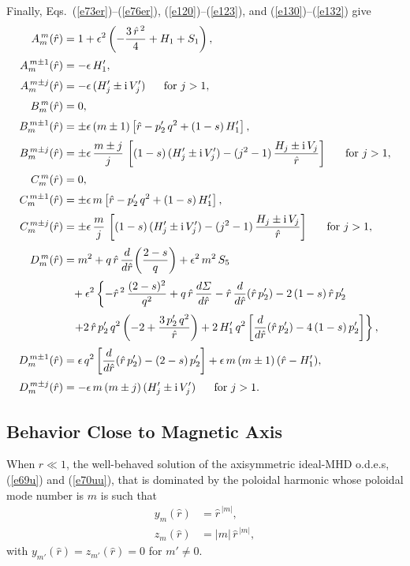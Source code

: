 \documentclass[12pt,prb,aps,notitlepage]{revtex4-1}
\begin{document}
Finally, Eqs.~(\ref{e73er})--(\ref{e76er}), (\ref{e120})--(\ref{e123}), and (\ref{e130})--(\ref{e132}) give 
\begin{align}
A_m^{\,m}(\hat{r}) &= 1 + \epsilon^2\left(-\frac{3\,\hat{r}^{\,2}}{4} + H_1+S_1\right),\\[0.5ex]
A_m^{\,m\pm 1}(\hat{r}) &= - \epsilon\,H_1',\\[0.5ex]
A_m^{\,m\pm j}(\hat{r}) &= -\epsilon\,(H_j'\pm {\rm i}\, V_j')~~~~~\mbox{for $j>1$},\\[0.5ex]
B_m^{\,m}(\hat{r}) &= 0,\\[0.5ex]
B_m^{\,m\pm 1}(\hat{r}) &= \pm \epsilon\,(m\pm 1)\left[\hat{r}-p_2'\,q^2+(1-s)\,H_1'\right],\\[0.5ex]
B_m^{\,m\pm j}(\hat{r}) &= \pm\epsilon\,\frac{m\pm j}{j}\,\left[(1-s)\,(H_j'\pm {\rm i}\,V_j')- (j^2-1)\,\frac{H_j\pm {\rm i}\,V_j}{\hat{r}}\right]~~~~~\mbox{for $j>1$},\\[0.5ex]
C_m^{\,m}(\hat{r}) &= 0,\\[0.5ex]
C_m^{\,m\pm 1}(\hat{r}) &= \pm \epsilon\,m\left[\hat{r}-p_2'\,q^2+(1-s)\,H_1'\right],\\[0.5ex]
C_m^{\,m\pm j}(\hat{r}) &= \pm\epsilon\,\frac{m}{j}\,\left[(1-s)\,(H_j'\pm {\rm i}\,V_j')- (j^2-1)\,\frac{H_j\pm {\rm i}\,V_j}{\hat{r}}\right]~~~~~\mbox{for $j>1$},\\[0.5ex]
D_m^{\,m}(\hat{r}) &= m^2 + q\,\hat{r}\,\frac{d}{d\hat{r}}\!\left(\frac{2-s}{q}\right) +\epsilon^2\,m^2\,S_5\nonumber\\[0.5ex]
&\phantom{=}+\epsilon^2\left\{-\hat{r}^{\,2}\,\frac{(2-s)^2}{q^2}+q\,\hat{r}\,\frac{d{\mit\Sigma}}{d\hat{r}}- \hat{r}\,\frac{d}{d\hat{r}}(\hat{r}\,p_2') -2\,(1-s)\,\hat{r}\,p_2'
\right.\nonumber\\[0.5ex]
&\phantom{=}\left.+2\,\hat{r}\,p_2'\,q^2\left(-2 + \frac{3\,p_2'\,q^2}{\hat{r}}\right) + 2\,H_1'\,q^2\left[\frac{d}{d\hat{r}}(\hat{r}\,p_2')-4\,(1-s)\,p_2'\right]\right\},\\[0.5ex]
D_m^{\,m\pm 1}(\hat{r}) &=\epsilon\,q^2\left[\frac{d}{d\hat{r}}(\hat{r}\,p_2') - (2-s)\,p_2'\right] + \epsilon\,m\,(m\pm 1)\,(\hat{r}-H_1'),\\[0.5ex]
D_m^{\,m\pm j}(\hat{r}) &= -\epsilon\,m\,(m\pm j)\,(H_j'\pm {\rm i}\,V_j')~~~~~\mbox{for $j>1$}.
\end{align}

\subsection{Behavior Close to Magnetic Axis}
When $\hat{r}\ll 1$, the well-behaved solution of the axisymmetric ideal-MHD o.d.e.s, (\ref{e69u}) and (\ref{e70uu}), that is dominated by the poloidal harmonic whose poloidal mode number is
$m$ is such that
\begin{align}
y_m(\hat{r}) &= \hat{r}^{\,|m|},\\[0.5ex]
z_m(\hat{r}) &= |m|\,\hat{r}^{\,|m|},
\end{align}
with $y_{m'}(\hat{r})=z_{m'}(\hat{r})=0$ for $m'\neq 0$. 
\end{document}
